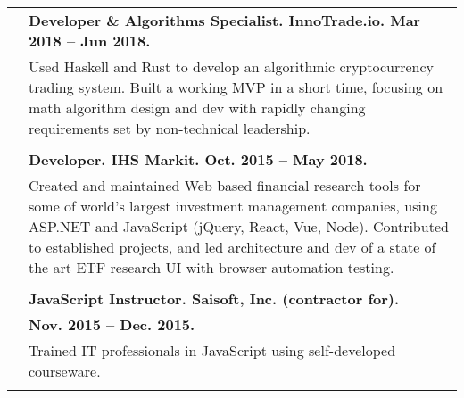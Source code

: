 \documentclass{article}
\begin{document}
\begin{tabular}{rl}
  & {\bf Developer \& Algorithms Specialist. InnoTrade.io. Mar 2018 -- Jun 2018.} \\
  & \parbox{4.5in}{Used Haskell and Rust to develop an algorithmic cryptocurrency trading system. Built a working MVP in a short time, focusing on math algorithm design and dev with rapidly changing requirements set by non-technical leadership.} \\ \\

  & {\bf Developer. IHS Markit. Oct. 2015 -- May 2018.} \\
  & \parbox{4.5in}{Created and maintained Web based financial research tools for some of world's largest investment management companies, using ASP.NET and JavaScript (jQuery, React, Vue, Node). Contributed to established projects, and led architecture and dev of a state of the art ETF research UI with browser automation testing.} \\ \\

  & {\bf JavaScript Instructor. Saisoft, Inc. (contractor for).} \\ & {\bf Nov. 2015 -- Dec. 2015.} \\
  & \parbox{4.5in}{Trained IT professionals in JavaScript using self-developed courseware.} \\ \\
\end{tabular}
\end{document}
